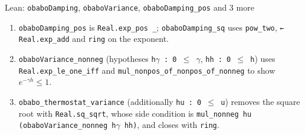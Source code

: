 \documentclass[11pt,a4paper]{article}
\begin{document}
\begin{leanbox}{Lean: \texttt{obaboDamping}, \texttt{obaboVariance}, \texttt{obaboDamping\_\allowbreak{}pos} and 3 more}
\begin{enumerate}
\item \texttt{obabo\allowbreak{}Damping\_\allowbreak{}pos} is \texttt{Real.\allowbreak{}exp\_\allowbreak{}pos \_\allowbreak{}}; \texttt{obabo\allowbreak{}Damping\_\allowbreak{}sq} uses \texttt{pow\_\allowbreak{}two}, \texttt{← Real.\allowbreak{}exp\_\allowbreak{}add} and \texttt{ring} on the exponent.

\item \texttt{obabo\allowbreak{}Variance\_\allowbreak{}nonneg} (hypotheses \texttt{h\ensuremath{\gamma} : 0 \ensuremath{\le} \ensuremath{\gamma}}, \texttt{hh : 0 \ensuremath{\le} h}) uses \texttt{Real.\allowbreak{}exp\_\allowbreak{}le\_\allowbreak{}one\_\allowbreak{}iff} and \texttt{mul\_\allowbreak{}nonpos\_\allowbreak{}of\_\allowbreak{}nonpos\_\allowbreak{}of\_\allowbreak{}nonneg} to show \(e^{-\gamma h}\le1\).

\item \texttt{obabo\_\allowbreak{}thermostat\_\allowbreak{}variance} (additionally \texttt{hu : 0 \ensuremath{\le} u}) removes the square root with \texttt{Real.\allowbreak{}sq\_\allowbreak{}sqrt}, whose side condition is \texttt{mul\_\allowbreak{}nonneg hu (obabo\allowbreak{}Variance\_\allowbreak{}nonneg h\ensuremath{\gamma} hh)}, and closes with \texttt{ring}.

\end{enumerate}
\end{leanbox}
\end{document}
